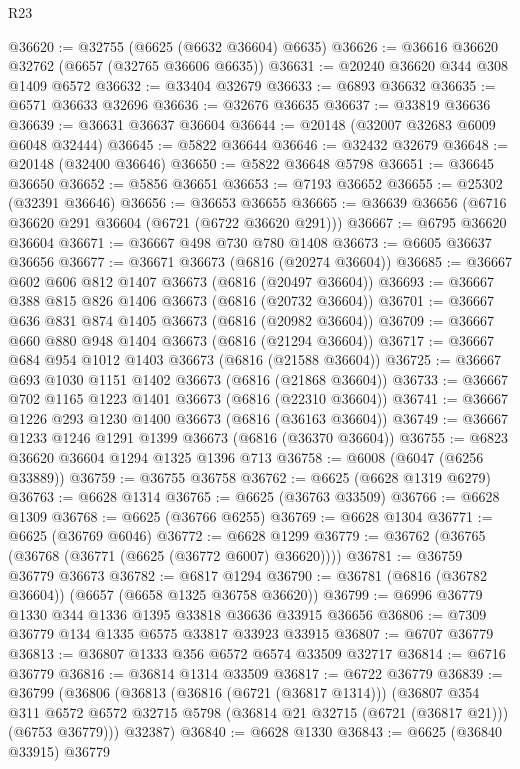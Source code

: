 \begin{lexlean}{R23}
\begin{coremodule}
@36620 := @32755 (@6625 (@6632 @36604) @6635)
@36626 := @36616 @36620 @32762 (@6657 (@32765 @36606 @6635))
@36631 := @20240 @36620 @344 @308 @1409 @6572
@36632 := @33404 @32679
@36633 := @6893 @36632
@36635 := @6571 @36633 @32696
@36636 := @32676 @36635
@36637 := @33819 @36636
@36639 := @36631 @36637 @36604
@36644 := @20148 (@32007 @32683 @6009 @6048 @32444)
@36645 := @5822 @36644
@36646 := @32432 @32679
@36648 := @20148 (@32400 @36646)
@36650 := @5822 @36648 @5798
@36651 := @36645 @36650
@36652 := @5856 @36651
@36653 := @7193 @36652
@36655 := @25302 (@32391 @36646)
@36656 := @36653 @36655
@36665 := @36639 @36656 (@6716 @36620 @291 @36604 (@6721 (@6722 @36620 @291)))
@36667 := @6795 @36620 @36604
@36671 := @36667 @498 @730 @780 @1408
@36673 := @6605 @36637 @36656
@36677 := @36671 @36673 (@6816 (@20274 @36604))
@36685 := @36667 @602 @606 @812 @1407 @36673 (@6816 (@20497 @36604))
@36693 := @36667 @388 @815 @826 @1406 @36673 (@6816 (@20732 @36604))
@36701 := @36667 @636 @831 @874 @1405 @36673 (@6816 (@20982 @36604))
@36709 := @36667 @660 @880 @948 @1404 @36673 (@6816 (@21294 @36604))
@36717 := @36667 @684 @954 @1012 @1403 @36673 (@6816 (@21588 @36604))
@36725 := @36667 @693 @1030 @1151 @1402 @36673 (@6816 (@21868 @36604))
@36733 := @36667 @702 @1165 @1223 @1401 @36673 (@6816 (@22310 @36604))
@36741 := @36667 @1226 @293 @1230 @1400 @36673 (@6816 (@36163 @36604))
@36749 := @36667 @1233 @1246 @1291 @1399 @36673 (@6816 (@36370 @36604))
@36755 := @6823 @36620 @36604 @1294 @1325 @1396 @713
@36758 := @6008 (@6047 (@6256 @33889))
@36759 := @36755 @36758
@36762 := @6625 (@6628 @1319 @6279)
@36763 := @6628 @1314
@36765 := @6625 (@36763 @33509)
@36766 := @6628 @1309
@36768 := @6625 (@36766 @6255)
@36769 := @6628 @1304
@36771 := @6625 (@36769 @6046)
@36772 := @6628 @1299
@36779 := @36762 (@36765 (@36768 (@36771 (@6625 (@36772 @6007) @36620))))
@36781 := @36759 @36779 @36673
@36782 := @6817 @1294
@36790 := @36781 (@6816 (@36782 @36604)) (@6657 (@6658 @1325 @36758 @36620))
@36799 := @6996 @36779 @1330 @344 @1336 @1395 @33818 @36636 @33915 @36656
@36806 := @7309 @36779 @134 @1335 @6575 @33817 @33923 @33915
@36807 := @6707 @36779
@36813 := @36807 @1333 @356 @6572 @6574 @33509 @32717
@36814 := @6716 @36779
@36816 := @36814 @1314 @33509
@36817 := @6722 @36779
@36839 := @36799
    (@36806
      (@36813
        (@36816 (@6721 (@36817 @1314)))
        (@36807
          @354
          @311
          @6572
          @6572
          @32715
          @5798
          (@36814 @21 @32715 (@6721 (@36817 @21)))
          (@6753 @36779)))
      @32387)
@36840 := @6628 @1330
@36843 := @6625 (@36840 @33915) @36779

\end{coremodule}
\end{lexlean}
